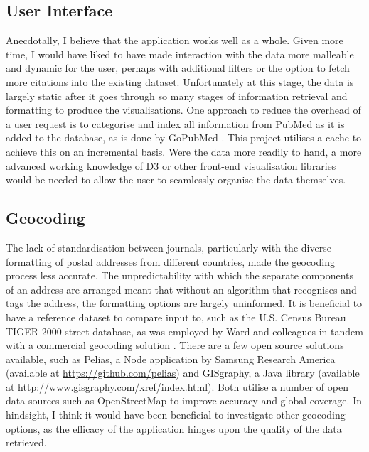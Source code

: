 \documentclass[Report.tex]{subfiles}
\begin{document}
\subsection{User Interface}
Anecdotally, I believe that the application works well as a whole. Given more time, I would have liked to have made interaction with the data more malleable and dynamic for the user, perhaps with additional filters or the option to fetch more citations into the existing dataset. Unfortunately at this stage, the data is largely static after it goes through so many stages of information retrieval and formatting to produce the visualisations. One approach to reduce the overhead of a user request is to categorise and index all information from PubMed as it is added to the database, as is done by GoPubMed \cite{gopubmed}. This project utilises a cache to achieve this on an incremental basis. Were the data more readily to hand, a more advanced working knowledge of D3 or other front-end visualisation libraries would be needed to allow the user to seamlessly organise the data themselves.\newline 

\subsection{Geocoding}
The lack of standardisation between journals, particularly with the diverse formatting of postal addresses from different countries, made the geocoding process less accurate. The unpredictability with which the separate components of an address are arranged meant that without an algorithm that recognises and tags the address, the formatting options are largely uninformed. It is beneficial to have a reference dataset to compare input to, such as the U.S. Census Bureau TIGER 2000 street database, as was employed by Ward and colleagues in tandem with a commercial geocoding solution \cite{ward}. There are a few open source solutions available, such as Pelias, a Node application by Samsung Research America (available at \url{https://github.com/pelias}) and GISgraphy, a Java library (available at \url{http://www.gisgraphy.com/xref/index.html}). Both utilise a number of open data sources such as OpenStreetMap to improve accuracy and global coverage. In hindsight, I think it would have been beneficial to investigate other geocoding options, as the efficacy of the application hinges upon the quality of the data retrieved. 
\end{document}
